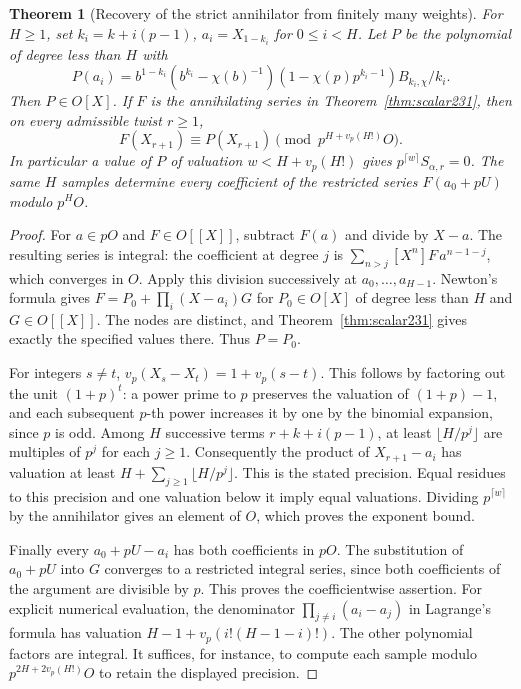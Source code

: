 \documentclass[a4paper,11pt]{article}
\newtheorem{theorem}[proposition]{Theorem}
\theoremstyle{definition}
\theoremstyle{remark}
\numberwithin{equation}{section}
\begin{document}
\begin{theorem}[Recovery of the strict annihilator from finitely many weights]
\leavevmode\label{thm:newton235}
For \(H\ge1\), set \(k_i=k+i(p-1)\), \(a_i=X_{1-k_i}\)
for \(0\le i<H\). Let \(P\) be the polynomial of degree less
than \(H\) with
\[
 P(a_i)=
 b^{1-k_i}(b^{k_i}-\chi(b)^{-1})(1-\chi(p)p^{k_i-1})
                         B_{k_i,\chi}/k_i .
\]
Then \(P\in O[X]\). If \(F\) is the annihilating series in
Theorem~\ref{thm:scalar231}, then on every admissible twist
\(r\ge1\),
\[
 F(X_{r+1})\equiv P(X_{r+1})
         \pmod {p^{H+v_p(H!)}O}.
\]
In particular a value of \(P\) of valuation \(w<H+v_p(H!)\)
gives \(p^{\lceil w\rceil}S_{\alpha,r}=0\). The same \(H\)
samples determine every coefficient of the restricted series
\(F(a_0+pU)\) modulo \(p^H O\).
\end{theorem}
\begin{proof}
For \(a\in pO\) and \(F\in O[[X]]\), subtract \(F(a)\) and
divide by \(X-a\). The resulting series is integral: the
coefficient at degree \(j\) is
\(\sum_{n>j}[X^n]F\,a^{n-1-j}\), which converges in \(O\).
Apply this division successively at \(a_0,\ldots,a_{H-1}\).
Newton's formula gives \(F=P_0+\prod_i(X-a_i)G\) for
\(P_0\in O[X]\) of degree less than \(H\) and \(G\in O[[X]]\).
The nodes are distinct, and Theorem~\ref{thm:scalar231} gives
exactly the specified values there. Thus \(P=P_0\).

For integers \(s\ne t\),
\(v_p(X_s-X_t)=1+v_p(s-t)\). This follows by factoring out
the unit \((1+p)^t\): a power prime to \(p\) preserves the
valuation of \((1+p)-1\), and each subsequent \(p\)-th power
increases it by one by the binomial expansion, since \(p\)
is odd. Among \(H\) successive terms \(r+k+i(p-1)\), at least
\(\lfloor H/p^j\rfloor\) are multiples of \(p^j\) for each
\(j\ge1\). Consequently the product of \(X_{r+1}-a_i\) has
valuation at least \(H+\sum_{j\ge1}\lfloor H/p^j\rfloor\).
This is the stated precision. Equal residues to this precision
and one valuation below it imply equal valuations. Dividing
\(p^{\lceil w\rceil}\) by the annihilator gives an element of
\(O\), which proves the exponent bound.

Finally every \(a_0+pU-a_i\) has both coefficients in \(pO\).
The substitution of \(a_0+pU\) into \(G\) converges to a
restricted integral series, since both coefficients of the
argument are divisible by \(p\). This proves the
coefficientwise assertion. For explicit numerical evaluation,
the denominator \(\prod_{j\ne i}(a_i-a_j)\) in Lagrange's
formula has valuation \(H-1+v_p(i!(H-1-i)!)\).
The other polynomial factors are integral. It suffices,
for instance, to compute each sample modulo
\(p^{2H+2v_p(H!)}O\) to retain the displayed precision.
\end{proof}
\end{document}
